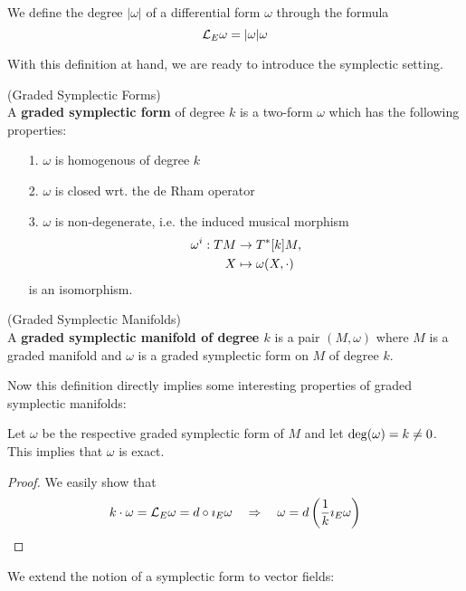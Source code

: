 \begin{definition}
  We define the degree $|\omega|$ of a differential form $\omega$ through the formula
  $$ \mathcal{L}_{E}\omega = |\omega| \omega $$
\end{definition}

With this definition at hand, we are ready to introduce the symplectic setting.

\begin{definition} (Graded Symplectic Forms)\\
  A \textbf{graded symplectic form} of degree $k$ is a two-form $\omega$ which has the following properties:
  \begin{itemize}
    \item[1.] $\omega$ is homogenous of degree $k$
    \item[2.] $\omega$ is closed wrt. the de Rham operator
    \item[3.] $\omega$ is non-degenerate, i.e. the induced musical morphism
    \begin{align}
      \omega^i : TM &\rightarrow T^*[k]M,\\
      X &\mapsto \omega(X, \cdot)
    \end{align}
    is an isomorphism.
  \end{itemize}
\end{definition}


\begin{definition} (Graded Symplectic Manifolds)\\
  A \textbf{graded symplectic manifold of degree $k$} is a pair $(M, \omega)$ where $M$ is a graded manifold and $\omega$ is a graded symplectic form on $M$ of degree $k$.
\end{definition}

Now this definition directly implies some interesting properties of graded symplectic manifolds:

\begin{lem}
 Let $\omega$ be the respective graded symplectic form of $M$ and let $\operatorname{deg}(\omega) = k \neq 0$. This implies that $\omega$ is exact.

\begin{proof}
  We easily show that
  $$ k \cdot \omega = \mathcal{L}_{E} \omega = d\circ \imath_E\omega \quad \Rightarrow \quad \omega = d\left( \frac{1}{k} \imath_E \omega \right) $$
\end{proof}
\end{lem}

We extend the notion of a symplectic form to vector fields:

